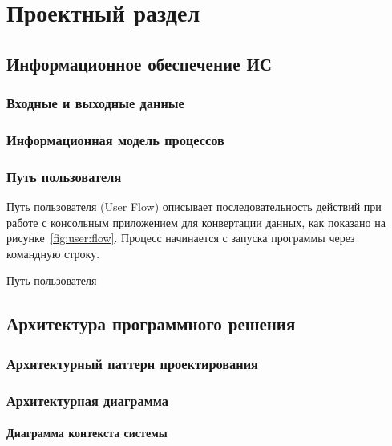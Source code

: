\chapter{Проектный раздел}

\section{Информационное обеспечение ИС}

\subsection{Входные и выходные данные}

\lipsum[1][1-3]

\subsection{Информационная модель процессов}

\lipsum[2][1-3]

\subsection{Путь пользователя}

Путь пользователя (User Flow) описывает последовательность действий
при работе с консольным приложением для конвертации данных,
как показано на рисунке~\ref{fig:user:flow}.
Процесс начинается с запуска программы через командную строку.

\begin{image}
   \caption{Путь пользователя}
   \label{fig:user:flow}
\end{image}

\section{Архитектура программного решения}

\subsection{Архитектурный паттерн проектирования}

\subsection{Архитектурная диаграмма}

\subsubsection{Диаграмма контекста системы}

